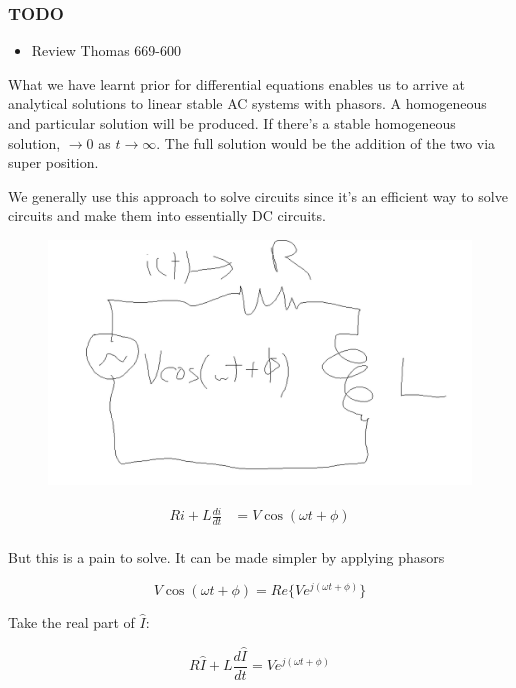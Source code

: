 \documentclass[10pt]{article}
\begin{document}
\subsubsection{TODO}
\begin{itemize}
	\item Review Thomas 669-600
\end{itemize}

What we have learnt prior for differential equations enables us to arrive at analytical solutions to linear stable AC systems with phasors.
A homogeneous and particular solution will be produced.
If there's a stable homogeneous solution, $ \to 0 $ as $ t \to \infty $. The full solution would be the addition of the two via super position.

We generally use this approach to solve circuits since it's an efficient way to solve circuits and make them into essentially DC circuits.

\begin{figure}[H]
	\centering
	\includegraphics[width=0.8\linewidth]{img/image_2022-09-09-15-23-06.png}
\end{figure}

\begin{equation}
	\begin{split}
		Ri + L \frac{di}{dt} &= V \cos{(\omega t + \phi)}  \\
	\end{split}
\end{equation}


But this is a pain to solve. It can be made simpler by applying phasors

\begin{equation}
	V \cos{(\omega t + \phi)}  = Re\{ Ve^{j(\omega t + \phi)} \}
\end{equation}

Take the real part of $ \hat{I} $:

\begin{equation}
	R \hat{I} + L \frac{d\hat{I}}{dt} = Ve^{j(\omega t + \phi)}
\end{equation}
\end{document}
